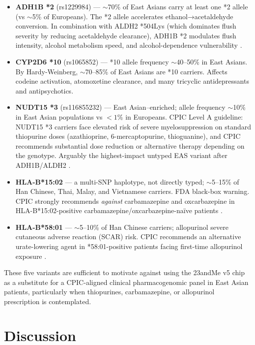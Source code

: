 \documentclass[11pt,a4paper]{article}
\begin{document}
\begin{itemize}
\item \textbf{ADH1B *2} (rs1229984) --- $\sim$70\% of East Asians carry at least one *2 allele (vs $\sim$5\% of Europeans). The *2 allele accelerates ethanol→acetaldehyde conversion. In combination with ALDH2 *504Lys (which dominates flush severity by reducing acetaldehyde clearance), ADH1B *2 modulates flush intensity, alcohol metabolism speed, and alcohol-dependence vulnerability \cite{edenberg2007}.
\item \textbf{CYP2D6 *10} (rs1065852) --- *10 allele frequency $\sim$40--50\% in East Asians. By Hardy-Weinberg, $\sim$70--85\% of East Asians are *10 carriers. Affects codeine activation, atomoxetine clearance, and many tricyclic antidepressants and antipsychotics.
\item \textbf{NUDT15 *3} (rs116855232) --- East Asian–enriched; allele frequency $\sim$10\% in East Asian populations vs $<1\%$ in Europeans. CPIC Level A guideline: NUDT15 *3 carriers face elevated risk of severe myelosuppression on standard thiopurine doses (azathioprine, 6-mercaptopurine, thioguanine), and CPIC recommends substantial dose reduction or alternative therapy depending on the genotype. Arguably the highest-impact untyped EAS variant after ADH1B/ALDH2 \cite{cpic2018nudt15}.
\item \textbf{HLA-B*15:02} --- a multi-SNP haplotype, not directly typed; $\sim$5--15\% of Han Chinese, Thai, Malay, and Vietnamese carriers. FDA black-box warning. CPIC strongly recommends \emph{against} carbamazepine and oxcarbazepine in HLA-B*15:02-positive carbamazepine/oxcarbazepine-naïve patients \cite{cpic2018hlab1502}.
\item \textbf{HLA-B*58:01} --- $\sim$5--10\% of Han Chinese carriers; allopurinol severe cutaneous adverse reaction (SCAR) risk. CPIC recommends an alternative urate-lowering agent in *58:01-positive patients facing first-time allopurinol exposure \cite{cpic2016hlab5801}.
\end{itemize}

These five variants are sufficient to motivate against using the 23andMe v5 chip as a substitute for a CPIC-aligned clinical pharmacogenomic panel in East Asian patients, particularly when thiopurines, carbamazepine, or allopurinol prescription is contemplated.

\section{Discussion}
\end{document}
